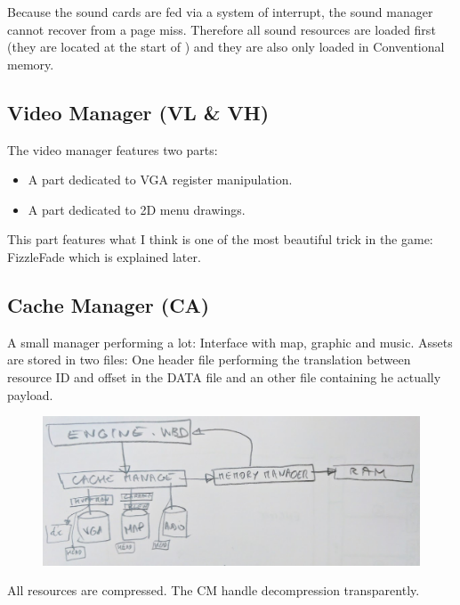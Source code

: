 \documentclass[book.tex]{subfiles}
\begin{document}
\par
{} Because the sound cards are fed via a system of interrupt, the sound manager cannot recover from a page miss. Therefore all sound resources are loaded first (they are located at the start of ) and they are also only loaded in Conventional memory.











\subsection{Video Manager (VL \& VH)}
The video manager features two parts:
\begin{itemize}
\item A part dedicated to VGA register manipulation.
\item A part dedicated to 2D menu drawings.
\end{itemize}
\par
This part features what I think is one of the most beautiful trick in the game: FizzleFade which is explained later.






\subsection{Cache Manager (CA)}
A small manager performing a lot: Interface with map, graphic and music. Assets are stored in two files: One header file performing the translation between resource ID and offset in the DATA file and an other file containing he actually payload.\\
 \par
\begin{figure}[H]
\centering
 \includegraphics[width=\textwidth]{imgs/cache_manager_architecture.png}
 \end{figure}
 \par
{} All resources are compressed. The CM handle decompression transparently.
\end{document}
